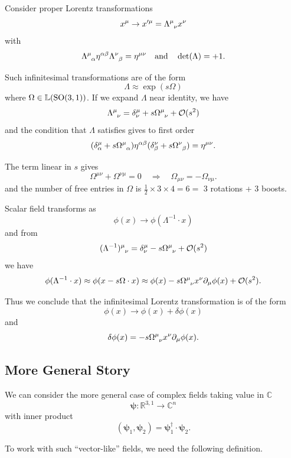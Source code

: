 \documentclass[a4paper,11pt]{article}
\begin{document}
	\begin{ex}
		Consider proper Lorentz transformations
		\[
			x^\mu \to x'^\mu = \LT{\mu}{\nu} x ^{\nu}
		\]
		with
		\[
			\LT{\mu}{\alpha} \eta ^{\alpha \beta} \LT{\nu}{\beta} = \eta ^{\mu \nu} \quad \text{and} \quad \det (\Lambda) = +1.
		\]
		
		Such infinitesimal transformations are of the form \[
			\Lambda \approx \exp(s \Omega)
		\]
		where $\Omega \in \mathbb{L}(\operatorname{SO}(3,1))$. If we expand $\Lambda$ near identity, we have
		\[
			\LT{\mu}{\nu} = \delta^\mu _\nu + s \Omega\indices{^{\mu}_{\nu}} + \mathcal{O}(s^2)
		\]
		and the condition that $\Lambda$ satisfies gives to first order
		\[
			(\delta^\mu_\alpha + s \Omega\indices{^\mu_\alpha})\eta ^{\alpha \beta} (\delta^\nu_\beta + s \Omega\indices{^\nu _\beta}) = \eta ^{\mu \nu}.
		\]
		
		The term linear in $s$ gives
		\[
			\Omega ^{\mu \nu} + \Omega ^{\nu \mu} = 0 \quad \Rightarrow \quad \Omega _{\mu \nu} = - \Omega _{\nu \mu}.
		\]
		and the number of free entries in $\Omega$ is $\frac{1}{2} \times 3 \times 4 = 6 =$ 3 rotations + 3 boosts.

		Scalar field transforms as
		\[
			\phi(x) \to \phi(\Lambda^{-1}\cdot x)
		\]
		and from
		\[
			(\Lambda^{-1})\indices{^\mu_\nu} = \delta^\mu_\nu - s \Omega\indices{^\mu_\nu} + \mathcal{O}(s^2)
		\]
		we have
		\[
			\phi(\Lambda^{-1} \cdot x) \approx \phi(x - s \Omega \cdot x) \approx \phi(x) - s \Omega\indices{^\mu_\nu} x^\nu \partial_\mu \phi(x) + \mathcal{O}(s^2).
		\]
		
		Thus we conclude that the infinitesimal Lorentz transformation is of the form
		\[
			\phi(x) \to \phi(x) + \delta \phi(x)
		\]
		and 
		\begin{equation}
			\delta \phi(x) = -s \Omega\indices{^\mu_\nu} x^\nu \partial_\mu \phi(x).
		\end{equation}
	\end{ex}

	\subsection{More General Story}

	We can consider the more general case of complex fields taking value in $\mathbb{C}$
	\[
		\bm{\psi}: \mathbb{R}^{3,1} \to \mathbb{C}^n
	\]
	with inner product
	\[
		(\bm{\psi}_1, \bm \psi_2) = \bm \psi_1^\dagger \cdot \bm \psi_2.
	\]
	
	To work with such ``vector-like'' fields, we need the following definition.
\end{document}
